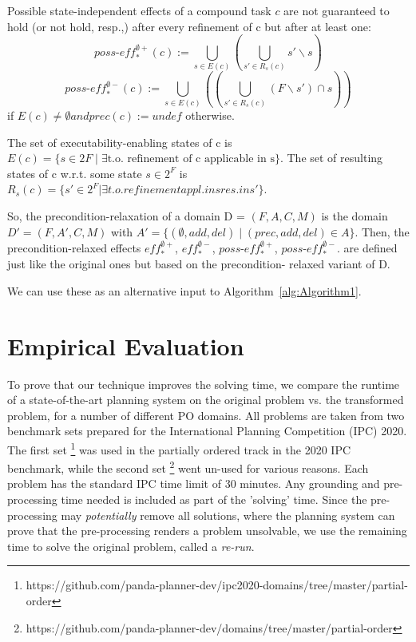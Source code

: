 \documentclass[letterpaper]{article} %
\newcommand{\RelEffPlus} {\ensuremath{\mathit{eff^{\emptyset +}_{*}}}}
\newcommand{\RelEffMinus} {\ensuremath{\mathit{eff^{\emptyset -}_{*}}}}
\newcommand{\RelPossEffPlus} {\ensuremath{\mathit{\textit{poss-eff}^{\emptyset +}_{*}}}}
\newcommand{\RelPossEffMinus} {\ensuremath{\mathit{\textit{poss-eff}^{\emptyset -}_{*}}}}
\begin{document}
Possible state-independent effects of a compound task $c$ are not guaranteed to hold (or not hold, resp.,)
after every refinement of c but after at least one:
$$ \RelPossEffPlus(c) := \bigcup_{s \in E(c)}  ( \bigcup_{s' \in R_s(c)}  s' \backslash s) $$
$$ \RelPossEffMinus(c) := \bigcup_{s \in E(c)} ((\bigcup_{s' \in R_s(c)} (F \backslash s') \cap s ))$$
if $E(c) \neq \emptyset and prec(c) := undef$ otherwise.


The set of executability-enabling states of c is
$E(c) = \{s \in 2F  \mid  \exists \text{t.o. refinement of c applicable in s} \}$.
The set of resulting states of c w.r.t. some state $s \in 2^F$ is
$R_s(c) = \{s' \in 2^F | \exists t.o. refinement appl. in s res. in s' \}$.

So, the precondition-relaxation of a domain D = $(F, A, C, M)$ is the domain $D' = (F, A', C, M)$
with $A' = \{(\emptyset, add , del ) \mid (prec, add , del ) \in A\}$.
Then, the precondition-relaxed effects $\RelEffPlus$, $\RelEffMinus$, $\RelPossEffPlus$, $\RelPossEffMinus$. are defined
just like the original ones but based on the precondition-
relaxed variant of D.

We can use these as an alternative input to Algorithm~\ref{alg:Algorithm1}.




\section{Empirical Evaluation}

To prove that our technique improves the solving time, we compare the runtime of a state-of-the-art planning system on the original problem vs. the transformed problem, for a number of different PO domains. All problems are taken from two benchmark sets prepared for the International Planning Competition (IPC) 2020. The first set \footnote{https://github.com/panda-planner-dev/ipc2020-domains/tree/master/partial-order} was used in the partially ordered track in the 2020 IPC benchmark, while the second set \footnote{https://github.com/panda-planner-dev/domains/tree/master/partial-order} went un-used for various reasons. Each problem has the standard IPC time limit of 30 minutes. Any grounding and pre-processing time needed is included as part of the 'solving' time. Since the pre-processing may \emph{potentially} remove all solutions, where the planning system can prove that the pre-processing renders a problem unsolvable, we use the remaining time to solve the original problem, called a \textit{re-run}.
\end{document}
